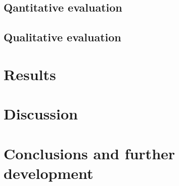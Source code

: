 \documentclass{article}
\begin{document}
    \subsection{Qantitative evaluation}
    
    \subsection{Qualitative evaluation}
    
    \section{Results}
    
    \section{Discussion}
    
    \section{Conclusions and further development}

    \printbibliography
\end{document}

